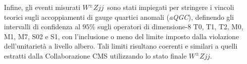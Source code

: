 \documentclass[11pt]{article}
\newcommand{\wzjj}{$W^\pm Z jj$}
\begin{document}
Infine, gli eventi misurati \wzjj\ sono stati impiegati per stringere i vincoli teorici sugli accoppiamenti di gauge quartici anomali (\textit{aQGC}), definendo gli intervalli di confidenza al $95\%$ sugli operatori di dimensione-8 T0, T1, T2, M0, M1, M7, S02 e S1, con l'inclusione o meno del limite imposto dalla violazione dell'unitarietà a livello albero. Tali limiti risultano coerenti e similari a quelli estratti dalla Collaborazione CMS utilizzando lo stato finale \wzjj.
\end{document}

